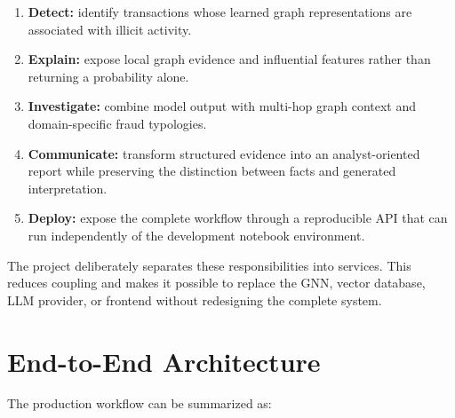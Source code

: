 \documentclass[11pt,a4paper]{report}
\begin{document}
\begin{enumerate}[leftmargin=1.5em]
  \item \textbf{Detect:} identify transactions whose learned graph representations are associated with illicit activity.
  \item \textbf{Explain:} expose local graph evidence and influential features rather than returning a probability alone.
  \item \textbf{Investigate:} combine model output with multi-hop graph context and domain-specific fraud typologies.
  \item \textbf{Communicate:} transform structured evidence into an analyst-oriented report while preserving the distinction between facts and generated interpretation.
  \item \textbf{Deploy:} expose the complete workflow through a reproducible API that can run independently of the development notebook environment.
\end{enumerate}

The project deliberately separates these responsibilities into services. This reduces coupling and makes it possible to replace the GNN, vector database, LLM provider, or frontend without redesigning the complete system.

\section{End-to-End Architecture}

The production workflow can be summarized as:

\begin{center}
\end{center}
\end{document}
